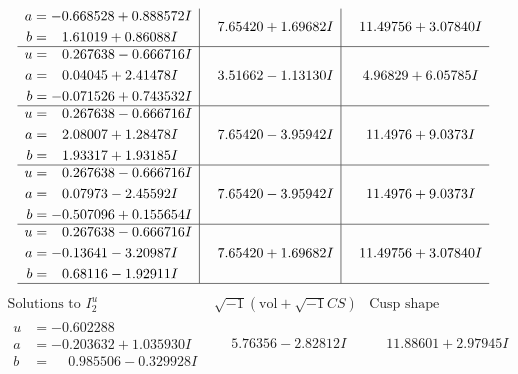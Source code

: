 \documentclass[1p]{elsarticle_modified}
\theoremstyle{definition}
\newcommand{\I}{\sqrt{-1}}
\begin{document}
$$\begin{array}{c|c|c}
\begin{aligned}
a &= -0.668528 + 0.888572 I \\
b &= \phantom{-}1.61019 + 0.86088 I\end{aligned}
 & \phantom{-}7.65420 + 1.69682 I & \phantom{-}11.49756 + 3.07840 I \\ \hline\begin{aligned}
u &= \phantom{-}0.267638 - 0.666716 I \\
a &= \phantom{-}0.04045 + 2.41478 I \\
b &= -0.071526 + 0.743532 I\end{aligned}
 & \phantom{-}3.51662 - 1.13130 I & \phantom{-}4.96829 + 6.05785 I \\ \hline\begin{aligned}
u &= \phantom{-}0.267638 - 0.666716 I \\
a &= \phantom{-}2.08007 + 1.28478 I \\
b &= \phantom{-}1.93317 + 1.93185 I\end{aligned}
 & \phantom{-}7.65420 - 3.95942 I & \phantom{-}11.4976 + 9.0373 I \\ \hline\begin{aligned}
u &= \phantom{-}0.267638 - 0.666716 I \\
a &= \phantom{-}0.07973 - 2.45592 I \\
b &= -0.507096 + 0.155654 I\end{aligned}
 & \phantom{-}7.65420 - 3.95942 I & \phantom{-}11.4976 + 9.0373 I \\ \hline\begin{aligned}
u &= \phantom{-}0.267638 - 0.666716 I \\
a &= -0.13641 - 3.20987 I \\
b &= \phantom{-}0.68116 - 1.92911 I\end{aligned}
 & \phantom{-}7.65420 + 1.69682 I & \phantom{-}11.49756 + 3.07840 I\\
 \hline 
 \end{array}$$\newpage$$\begin{array}{c|c|c}  
\text{Solutions to }I^u_{2}& \I (\text{vol} + \sqrt{-1}CS) & \text{Cusp shape}\\
 \hline 
\begin{aligned}
u &= -0.602288\phantom{ +0.000000I} \\
a &= -0.203632 + 1.035930 I \\
b &= \phantom{-}0.985506 - 0.329928 I\end{aligned}
 & \phantom{-}5.76356 - 2.82812 I & \phantom{-}11.88601 + 2.97945 I \\ \hline\begin{aligned}

\end{aligned}
\end{array}$$
\end{document}
